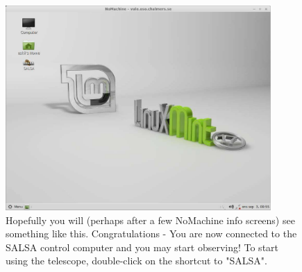 \begin{figure}[H]
    \centering
	\includegraphics[width=0.9\textwidth]{../figures/nomachinefigs/fig9-connected.pdf}
    \caption{Hopefully you will (perhaps after a few NoMachine info screens)
see something like this. Congratulations - You are now connected to the SALSA
control computer and you may start observing! 
To start using the telescope, double-click on the shortcut to "SALSA".} \label{fig:connected}
\end{figure}

